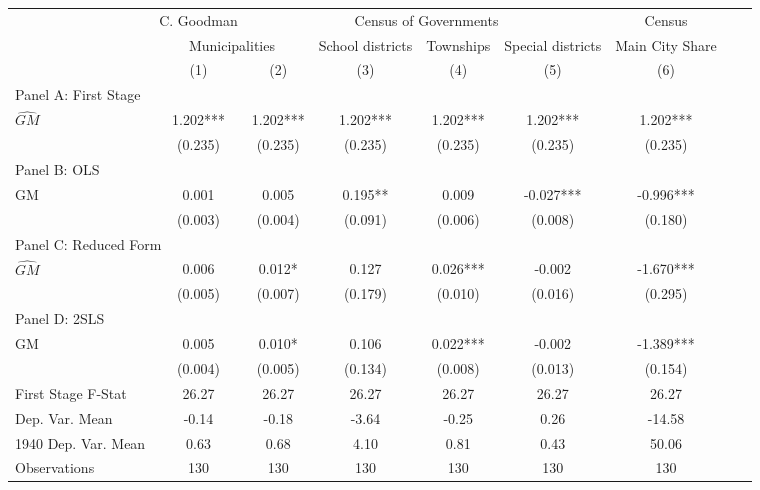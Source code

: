  \begin{tabular}{l*{8}{c}} \toprule
&\multicolumn{1}{c}{C. Goodman}&\multicolumn{4}{c}{Census of Governments}&\multicolumn{1}{c}{Census}\\\cmidrule(lr){2-2}\cmidrule(lr){3-6}\cmidrule(lr){7-7}
&\multicolumn{2}{c}{Municipalities}&\multicolumn{1}{c}{School districts}&\multicolumn{1}{c}{Townships}&\multicolumn{1}{c}{Special districts}&\multicolumn{1}{c}{Main City Share}\\\cmidrule(lr){2-3}\cmidrule(lr){4-6}\cmidrule(lr){7-7}
&\multicolumn{1}{c}{(1)}&\multicolumn{1}{c}{(2)}&\multicolumn{1}{c}{(3)}&\multicolumn{1}{c}{(4)}&\multicolumn{1}{c}{(5)}&\multicolumn{1}{c}{(6)}\\
\cmidrule(lr){1-7}
\multicolumn{6}{l}{Panel A: First Stage}\\
\cmidrule(lr){1-7}
$\widehat{GM}$  &    1.202***&    1.202***&    1.202***&    1.202***&    1.202***&    1.202***\\
                &  (0.235)   &  (0.235)   &  (0.235)   &  (0.235)   &  (0.235)   &  (0.235)   \\
\cmidrule(lr){1-7}
\multicolumn{6}{l}{Panel B: OLS}\\
\cmidrule(lr){1-7}
GM              &    0.001   &    0.005   &    0.195** &    0.009   &   -0.027***&   -0.996***\\
                &  (0.003)   &  (0.004)   &  (0.091)   &  (0.006)   &  (0.008)   &  (0.180)   \\
\cmidrule(lr){1-7}
\multicolumn{6}{l}{Panel C: Reduced Form}\\
\cmidrule(lr){1-7}
$\widehat{GM}$  &    0.006   &    0.012*  &    0.127   &    0.026***&   -0.002   &   -1.670***\\
                &  (0.005)   &  (0.007)   &  (0.179)   &  (0.010)   &  (0.016)   &  (0.295)   \\
\cmidrule(lr){1-7}
\multicolumn{6}{l}{Panel D: 2SLS}\\
\cmidrule(lr){1-7}
GM              &    0.005   &    0.010*  &    0.106   &    0.022***&   -0.002   &   -1.389***\\
                &  (0.004)   &  (0.005)   &  (0.134)   &  (0.008)   &  (0.013)   &  (0.154)   \\
\midrule
First Stage F-Stat&    26.27   &    26.27   &    26.27   &    26.27   &    26.27   &    26.27   \\
Dep. Var. Mean  &    -0.14   &    -0.18   &    -3.64   &    -0.25   &     0.26   &   -14.58   \\
1940 Dep. Var. Mean&     0.63   &     0.68   &     4.10   &     0.81   &     0.43   &    50.06   \\
Observations    &      130   &      130   &      130   &      130   &      130   &      130   \\
       \bottomrule \end{tabular}
